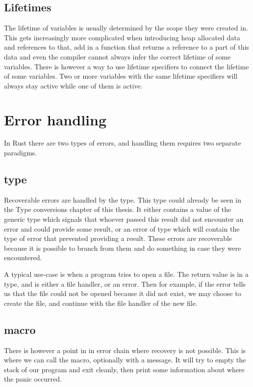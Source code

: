 \subsection{Lifetimes}

The lifetime of variables is usually determined by the scope they were created in. This gets increasingly more complicated when introducing heap allocated data and references to that, add in a function that returns a reference to a part of this data and even the compiler cannot always infer the correct lifetime of some variables. There is however a way to use lifetime specifiers to connect the lifetime of some variables. Two or more variables with the same lifetime specifiers will always stay active while one of them is active.

\section{Error handling}

In Rust there are two types of errors, and handling them requires two separate paradigms.

\subsection{ type}

Recoverable errors are handled by the  type. This type could already be seen in the Type conversions chapter of this thesis. It either contains a value of the generic  type which signals that whoever passed this result did not encounter an error and could provide some result, or an error of type  which will contain the type of error that prevented providing a result. These errors are recoverable because it is possible to branch from them and do something in case they were encountered.

A typical use-case is when a program tries to open a file. The return value is in a  type, and is either a file handler, or an error. Then for example, if the error tells us that the file could not be opened because it did not exist, we may choose to create the file, and continue with the file handler of the new file.

\subsection{ macro}

There is however a point in in error chain where recovery is not possible. This is where we can call the  macro, optionally with a message. It will try to empty the stack of our program and exit cleanly, then print some information about where the panic occurred.

